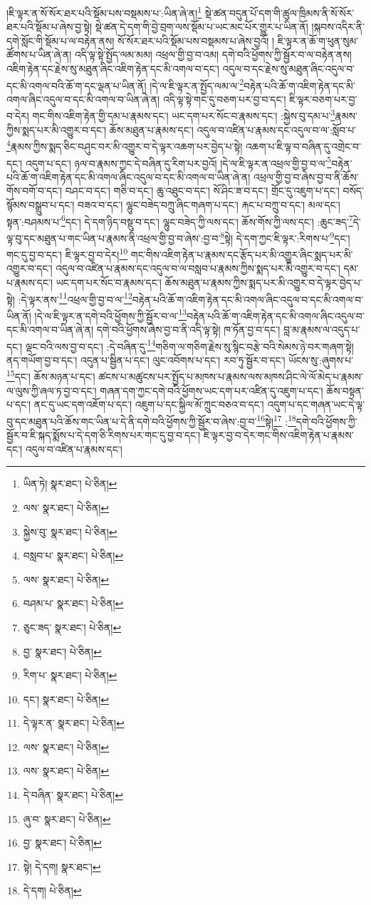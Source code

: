 །ཇི་ལྟར་ན་སོ་སོར་ཐར་པའི་སྡོམ་པས་བསྡམས་པ་:ཡིན་ཞེ་ན།\footnote{ཡིན་ཏེ།  སྣར་ཐང་།  པེ་ཅིན། } སྡེ་ཚན་བདུན་པོ་དག་གི་ཚུལ་ཁྲིམས་ནི་སོ་སོར་ཐར་པའི་སྡོམ་པ་ཞེས་བྱ་སྟེ། སྡེ་ཚན་དེ་དག་གི་བྱེ་བྲག་ལས་སྡོམ་པ་ཡང་མང་པོར་གྱུར་པ་ཡིན་ནོ། །སྐབས་འདིར་ནི་དགེ་སློང་གི་སྡོམ་པ་ལ་བརྟེན་ནས། སོ་སོར་ཐར་པའི་སྡོམ་པས་བསྡམས་པ་ཞེས་བྱའོ། །
ཇི་ལྟར་ན་ཆོ་ག་ཕུན་སུམ་ཚོགས་པ་ཡིན་ཞེ་ན། འདི་ལྟ་སྟེ་སྤྱོད་ལམ་མམ། འཕྲལ་གྱི་བྱ་བ་འམ། དགེ་བའི་ཕྱོགས་ཀྱི་སྦྱོར་བ་ལ་བརྟེན་ནས། འཇིག་རྟེན་དང་རྗེས་སུ་མཐུན་ཞིང་འཇིག་རྟེན་དང་མི་འགལ་བ་དང་། འདུལ་བ་དང་རྗེས་སུ་མཐུན་ཞིང་འདུལ་བ་དང་མི་འགལ་བའི་ཆོ་ག་དང་ལྡན་པ་ཡིན་ནོ། །དེ་ལ་ཇི་ལྟར་ན་སྤྱོད་ལམ་ལ་\footnote{ལས་  སྣར་ཐང་།  པེ་ཅིན། }བརྟེན་པའི་ཆོ་ག་འཇིག་རྟེན་དང་མི་འགལ་ཞིང་འདུལ་བ་དང་མི་འགལ་བ་ཡིན་ཞེ་ན། འདི་ལྟ་སྟེ་གང་དུ་བཅག་པར་བྱ་བ་དང་། ཇི་ལྟར་བཅག་པར་བྱ་བ་དེར། གང་གིས་འཇིག་རྟེན་གྱི་དམ་པ་རྣམས་དང་། ཡང་དག་པར་སོང་བ་རྣམས་དང་། :སྐྱེས་བུ་དམ་པ་\footnote{སྐྱེས་བུ་  སྣར་ཐང་།  པེ་ཅིན། }རྣམས་ཀྱིས་སྨད་པར་མི་འགྱུར་བ་དང་། ཆོས་མཐུན་པ་རྣམས་དང་། འདུལ་བ་འཛིན་པ་རྣམས་དང་འདུལ་བ་ལ་:སློབ་པ་\footnote{བསླབ་པ་  སྣར་ཐང་།  པེ་ཅིན། }རྣམས་ཀྱིས་སྨད་ཅིང་བཤུང་བར་མི་འགྱུར་བ་དེ་ལྟར་འཆག་པར་བྱེད་པ་སྟེ། འཆག་པ་ཇི་ལྟ་བ་བཞིན་དུ་འགྲེང་བ་དང་། འདུག་པ་དང་། ཉལ་བ་རྣམས་ཀྱང་དེ་བཞིན་དུ་རིག་པར་བྱའོ། །དེ་ལ་ཇི་ལྟར་ན་འཕྲལ་གྱི་བྱ་བ་ལ་\footnote{ལས་  སྣར་ཐང་།  པེ་ཅིན། }བརྟེན་པའི་ཆོ་ག་འཇིག་རྟེན་དང་མི་འགལ་ཞིང་འདུལ་བ་དང་མི་འགལ་བ་ཡིན་ཞེ་ན། འཕྲལ་གྱི་བྱ་བ་ཞེས་བྱ་བ་ནི་ཆོས་གོས་བགོ་བ་དང་། བཤང་བ་དང་། གཅི་བ་དང་། ཆུ་འཐུང་བ་དང་། སོ་ཤིང་ཟ་བ་དང་། གྲོང་དུ་འཇུག་པ་དང་། བསོད་སྙོམས་བསྒྲུབ་པ་དང་། བཟའ་བ་དང་། ལྷུང་བཟེད་བཀྲུ་ཞིང་གཞག་པ་དང་། རྐང་པ་བཀྲུ་བ་དང་། མལ་དང་། སྟན་:བཤམས་པ་\footnote{བཤམ་པ་  སྣར་ཐང་།  པེ་ཅིན། }དང་། དེ་དག་ཉིད་བསྡུ་བ་དང་། ལྷུང་བཟེད་ཀྱི་ལས་དང་། ཆོས་གོས་ཀྱི་ལས་དང་། :ཆུང་ཟད་\footnote{ཅུང་ཟད་  སྣར་ཐང་།  པེ་ཅིན། }དེ་ལྟ་བུ་དང་མཐུན་པ་གང་ཡིན་པ་རྣམས་ནི་འཕྲལ་གྱི་བྱ་བ་ཞེས་:བྱ་བ་\footnote{བྱ་  སྣར་ཐང་།  པེ་ཅིན། }སྟེ། དེ་དག་ཀྱང་ཇི་ལྟར་:རིགས་པ་\footnote{རིག་པ་  སྣར་ཐང་།  པེ་ཅིན། }དང་། གང་དུ་བྱ་བ་དང་། ཇི་ལྟར་བྱ་བ་དེར།\footnote{དང་།  སྣར་ཐང་།  པེ་ཅིན། } གང་གིས་འཇིག་རྟེན་པ་རྣམས་དང་རྩོད་པར་མི་འགྱུར་ཞིང་སྨད་པར་མི་འགྱུར་བ་དང་། འདུལ་བ་འཛིན་པ་རྣམས་དང་འདུལ་བ་ལ་བསླབ་པ་རྣམས་ཀྱིས་སྨད་པར་མི་འགྱུར་བ་དང་། དམ་པ་རྣམས་དང་། ཡང་དག་པར་སོང་བ་རྣམས་དང་། ཆོས་མཐུན་པ་རྣམས་ཀྱིས་སྨད་པར་མི་འགྱུར་བ་དེ་ལྟར་བྱེད་པ་སྟེ། :དེ་ལྟར་ནས་\footnote{དེ་ལྟར་ན་  སྣར་ཐང་།  པེ་ཅིན། }འཕྲལ་གྱི་བྱ་བ་ལ་\footnote{ལས་  སྣར་ཐང་།  པེ་ཅིན། }བརྟེན་པའི་ཆོ་ག་འཇིག་རྟེན་དང་མི་འགལ་ཞིང་འདུལ་བ་དང་མི་འགལ་བ་ཡིན་ནོ། །དེ་ལ་ཇི་ལྟར་ན་དགེ་བའི་ཕྱོགས་ཀྱི་སྦྱོར་བ་ལ་\footnote{ལས་  སྣར་ཐང་།  པེ་ཅིན། }བརྟེན་པའི་ཆོ་ག་འཇིག་རྟེན་དང་མི་འགལ་ཞིང་འདུལ་བ་དང་མི་འགལ་བ་ཡིན་ཞེ་ན། དགེ་བའི་ཕྱོགས་ཞེས་བྱ་བ་ནི་འདི་ལྟ་སྟེ། ཁ་ཏོན་བྱ་བ་དང་། བླ་མ་རྣམས་ལ་འདུད་པ་དང་། ལྡང་བའི་ལས་བྱ་བ་དང་། :དེ་བཞིན་དུ་\footnote{དེ་བཞིན་  སྣར་ཐང་།  པེ་ཅིན། }གཅིག་ལ་གཅིག་རྗེས་སུ་སྙིང་བརྩེ་བའི་སེམས་ཉེ་བར་གཞག་སྟེ། ནད་གཡོག་བྱ་བ་དང་། འདུན་པ་སྦྱིན་པ་དང་། ལུང་འབོགས་པ་དང་། རབ་ཏུ་སྦྱོར་བ་དང་། ཡོངས་སུ་:ཞུགས་པ་\footnote{ཞུ་བ་  སྣར་ཐང་།  པེ་ཅིན། }དང་། ཆོས་མཉན་པ་དང་། ཚངས་པ་མཚུངས་པར་སྤྱོད་པ་མཁས་པ་རྣམས་ལས་མཁས་ཤིང་ལེ་ལོ་མེད་པ་རྣམས་ལ་ལུས་ཀྱི་ཞལ་ཏ་བྱ་བ་དང་། གཞན་དག་ཀྱང་དགེ་བའི་ཕྱོགས་ཡང་དག་པར་འཛིན་དུ་འཇུག་པ་དང་། ཆོས་བསྟན་པ་དང་། ནང་དུ་ཡང་དག་འཇོག་པ་དང་། འཇུག་པ་དང་སྐྱིལ་མོ་ཀྲུང་བཅའ་བ་དང་། འདུག་པ་དང་གཞན་ཡང་དེ་ལྟ་བུ་དང་མཐུན་པའི་ཆོས་གང་ཡིན་པ་དེ་ནི་དགེ་བའི་ཕྱོགས་ཀྱི་སྦྱོར་བ་ཞེས་:བྱ་བ་\footnote{བྱ་  སྣར་ཐང་།  པེ་ཅིན། }སྟེ།\footnote{སྟེ། དེ་དག།  སྣར་ཐང་། } :\footnote{དེ་དག།   པེ་ཅིན། }དགེ་བའི་ཕྱོགས་ཀྱི་སྦྱོར་བ་ཇི་སྐད་སྨོས་པ་དེ་དག་ཅི་རིགས་པར་གང་དུ་བྱ་བ་དང་། ཇི་ལྟར་བྱ་བ་དེར་གང་གིས་འཇིག་རྟེན་པ་རྣམས་དང་། འདུལ་བ་འཛིན་པ་རྣམས་དང་། 